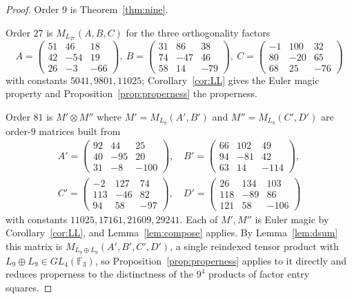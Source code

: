 \documentclass[11pt,a4paper]{amsart}
\theoremstyle{plain}
\theoremstyle{definition}
\theoremstyle{remark}
\newcommand{\FF}{\mathbb{F}}
\begin{document}
\begin{proof}
Order $9$ is Theorem~\ref{thm:nine}.

Order $27$ is $M_{L_{27}}(A,B,C)$ for the three orthogonality factors
\[
A=\begin{pmatrix}51&46&18\\42&-54&19\\26&-3&-66\end{pmatrix},\
B=\begin{pmatrix}31&86&38\\74&-47&46\\58&14&-79\end{pmatrix},\
C=\begin{pmatrix}-1&100&32\\80&-20&65\\68&25&-76\end{pmatrix}
\]
with constants $5041,9801,11025$; Corollary~\ref{cor:LL} gives the Euler magic
property and Proposition~\ref{prop:properness} the properness.

Order $81$ is $M'\otimes M''$ where $M'=M_{L_9}(A',B')$ and
$M''=M_{L_9}(C',D')$ are order-$9$ matrices built from
\[
\begin{gathered}
A'=\begin{pmatrix}92&44&25\\40&-95&20\\31&-8&-100\end{pmatrix},\quad
B'=\begin{pmatrix}66&102&49\\94&-81&42\\63&14&-114\end{pmatrix},\\[4pt]
C'=\begin{pmatrix}-2&127&74\\113&-46&82\\94&58&-97\end{pmatrix},\quad
D'=\begin{pmatrix}26&134&103\\118&-89&86\\121&58&-106\end{pmatrix}
\end{gathered}
\]
with constants $11025,17161,21609,29241$. Each of $M',M''$ is Euler magic by
Corollary~\ref{cor:LL}, and Lemma~\ref{lem:compose} applies. By
Lemma~\ref{lem:dsum} this matrix is $M_{L_9\oplus L_9}(A',B',C',D')$, a single
reindexed tensor product with $L_9\oplus L_9\in GL_4(\FF_3)$, so
Proposition~\ref{prop:properness} applies to it directly and reduces properness
to the distinctness of the $9^4$ products of factor entry squares.


\end{proof}
\end{document}
